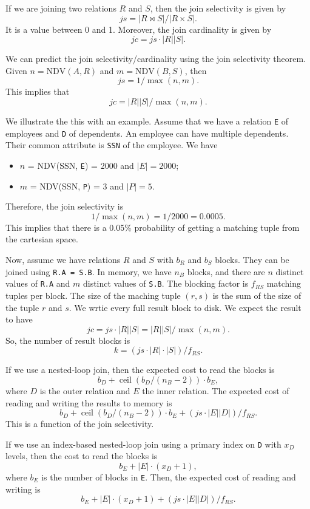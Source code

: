 \documentclass[a4paper, openany]{memoir}
\theoremstyle{definition}
\theoremstyle{plain}
\begin{document}
If we are joining two relations $R$ and $S$, then the join selectivity is given by
\[\textit{js} = |R \bowtie S|/|R \times S|.\]
It is a value between 0 and 1. Moreover, the join cardinality is given by
\[\textit{jc} = \textit{js} \cdot |R| |S|.\]

We can predict the join selectivity/cardinality using the join selectivity theorem. Given $n = \text{NDV}(A, R)$ and $m = \text{NDV}(B, S)$, then
\[\textit{js} = 1/\max(n, m).\]
This implies that 
\[\textit{jc} = |R| |S| / \max(n, m).\]

We illustrate the this with an example. Assume that we have a relation \texttt{E} of employees and \texttt{D} of dependents. An employee can have multiple dependents. Their common attribute is \texttt{SSN} of the employee. We have
\begin{itemize}
    \item $n$ = NDV(SSN, \texttt{E}) = 2000 and $|E| = 2000$;
    \item $m$ = NDV(SSN, \texttt{P}) = 3 and $|P| = 5$.
\end{itemize}
Therefore, the join selectivity is
\[1/\max(n, m) = 1/2000 = 0.0005.\]
This implies that there is a 0.05\% probability of getting a matching tuple from the cartesian space.

Now, assume we have relations $R$ and $S$ with $b_R$ and $b_S$ blocks. They can be joined using \texttt{R.A = S.B}. In memory, we have $n_B$ blocks, and there are $n$ distinct values of \texttt{R.A} and $m$ distinct values of \texttt{S.B}. The blocking factor is $f_{RS}$ matching tuples per block. The size of the maching tuple $(r, s)$ is the sum of the size of the tuple $r$ and $s$. We wrtie every full result block to disk. We expect the result to have
\[\textit{jc} = \textit{js} \cdot  |R| |S| = |R| |S| /\max(n, m).\]
So, the number of result blocks is
\[k = (\textit{js} \cdot |R| \cdot |S|)/f_{RS}.\]

If we use a nested-loop join, then the expected cost to read the blocks is
\[b_D + \operatorname{ceil}(b_D/(n_B-2)) \cdot b_E,\]
where $D$ is the outer relation and $E$ the inner relation. The expected cost of reading and writing the results to memory is 
\[b_D + \operatorname{ceil}(b_D/(n_B-2)) \cdot b_E + (\textit{js} \cdot |E| |D|)/ f_{RS}.\]
This is a function of the join selectivity.

If we use an index-based nested-loop join using a primary index on \texttt{D} with $x_D$ levels, then the cost to read the blocks is
\[b_E + |E| \cdot (x_D + 1),\]
where $b_E$ is the number of blocks in \texttt{E}. Then, the expected cost of reading and writing is
\[b_E + |E| \cdot (x_D + 1) + (\textit{js} \cdot |E| |D|)/ f_{RS}.\]
\end{document}
